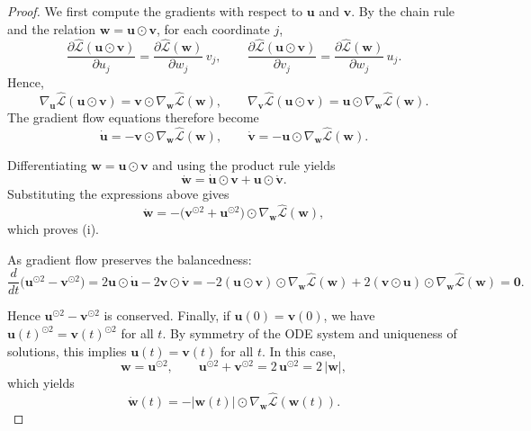 \documentclass{article}
\theoremstyle{plain}
\theoremstyle{definition}
\theoremstyle{remark}
\begin{document}
{\begin{proof}
We first compute the gradients with respect to $\boldsymbol u$ and $\boldsymbol v$.
By the chain rule and the relation $\boldsymbol w=\boldsymbol u\odot\boldsymbol v$, for each coordinate $j$,
\[
\frac{\partial \widehat{\mathcal L}(\boldsymbol u\odot\boldsymbol v)}{\partial u_j}
=
\frac{\partial \widehat{\mathcal L}(\boldsymbol w)}{\partial w_j}\, v_j,
\qquad
\frac{\partial \widehat{\mathcal L}(\boldsymbol u\odot\boldsymbol v)}{\partial v_j}
=
\frac{\partial \widehat{\mathcal L}(\boldsymbol w)}{\partial w_j}\, u_j.
\]
Hence,
\[
\nabla_{\boldsymbol u}\widehat{\mathcal L}(\boldsymbol u\odot\boldsymbol v)
=
\boldsymbol v\odot \nabla_{\boldsymbol w}\widehat{\mathcal L}(\boldsymbol w),
\qquad
\nabla_{\boldsymbol v}\widehat{\mathcal L}(\boldsymbol u\odot\boldsymbol v)
=
\boldsymbol u\odot \nabla_{\boldsymbol w}\widehat{\mathcal L}(\boldsymbol w).
\]
The gradient flow equations therefore become
\[
\dot{\boldsymbol u}
=
-\boldsymbol v\odot \nabla_{\boldsymbol w}\widehat{\mathcal L}(\boldsymbol w),
\qquad
\dot{\boldsymbol v}
=
-\boldsymbol u\odot \nabla_{\boldsymbol w}\widehat{\mathcal L}(\boldsymbol w).
\]

Differentiating $\boldsymbol w=\boldsymbol u\odot\boldsymbol v$ and using the product rule yields
\[
\dot{\boldsymbol w}
=
\dot{\boldsymbol u}\odot \boldsymbol v
+
\boldsymbol u\odot \dot{\boldsymbol v}.
\]
Substituting the expressions above gives
\[
\dot{\boldsymbol w}
=
-\big(\boldsymbol v^{\odot 2}+\boldsymbol u^{\odot 2}\big)
\odot
\nabla_{\boldsymbol w}\widehat{\mathcal L}(\boldsymbol w),
\]
which proves (i).

As gradient flow preserves the balancedness: 
\[
\frac{d}{dt}\big(\boldsymbol u^{\odot 2}-\boldsymbol v^{\odot 2}\big)
=
2\boldsymbol u\odot \dot{\boldsymbol u}
-
2\boldsymbol v\odot \dot{\boldsymbol v}=-2(\boldsymbol u\odot\boldsymbol v)\odot\nabla_{\boldsymbol w}\widehat{\mathcal L}(\boldsymbol w)
+
2(\boldsymbol v\odot\boldsymbol u)\odot\nabla_{\boldsymbol w}\widehat{\mathcal L}(\boldsymbol w)
=
\boldsymbol 0.
\]

Hence $\boldsymbol u^{\odot 2}-\boldsymbol v^{\odot 2}$ is conserved.
Finally, if $\boldsymbol u(0)=\boldsymbol v(0)$, we have
$\boldsymbol u(t)^{\odot 2}=\boldsymbol v(t)^{\odot 2}$ for all $t$.
By symmetry of the ODE system and uniqueness of solutions, this implies
$\boldsymbol u(t)=\boldsymbol v(t)$ for all $t$.
In this case,
\[
\boldsymbol w=\boldsymbol u^{\odot 2},
\qquad
\boldsymbol u^{\odot 2}+\boldsymbol v^{\odot 2}
=
2\,\boldsymbol u^{\odot 2}
=
2\,|\boldsymbol w|,
\]
which yields 
\[
\dot{\boldsymbol w}(t)
=
-|\boldsymbol w(t)|\odot
\nabla_{\boldsymbol w}\widehat{\mathcal L}(\boldsymbol w(t)).
\]
\end{proof}

}
\end{document}
